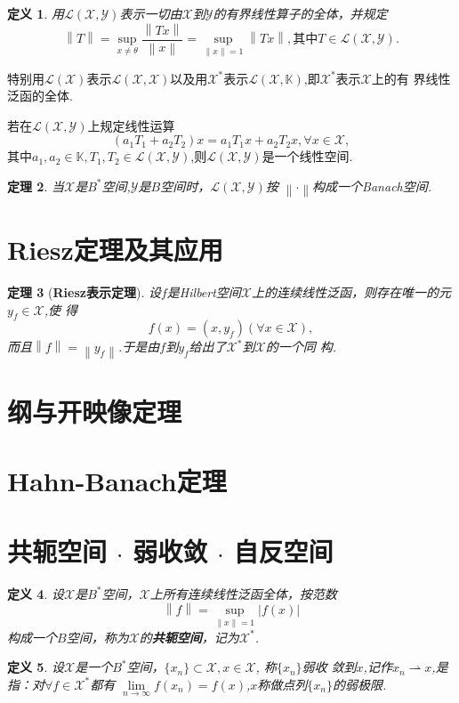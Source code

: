 \documentclass{ctexrep}
\newtheorem{defn}{定义}[section]
\newtheorem{thm}[defn]{定理}
\newcommand{\X}{\mathscr{X}}
\newcommand{\Y}{\mathscr{Y}}
\newcommand{\SCRL}{\mathscr{L}}
\newcommand{\K}{\mathbb{K}}
\newcommand{\LXY}{\mathscr{L}(\mathscr{X},\mathscr{Y})}
\newcommand{\LXX}{\mathscr{L}(\mathscr{X},\mathscr{X})}
\newcommand{\LXK}{\mathscr{L}(\mathscr{X},\mathbb{K})}
\newcommand{\norm}[1]{\left\lVert#1\right\rVert}
\newcommand{\abs}[1]{\left\lvert#1\right\rvert}
\begin{document}
\begin{defn}
用$\LXY$表示一切由$\X$到$\Y$的有界线性算子的全体，并规定
\[
\norm{T} = \sup_{x\neq \theta}\frac{\norm{Tx}}{\norm{x}} =
\sup_{\norm{x} = 1}\norm{Tx}, \text{其中}T \in \LXY.
\]
\end{defn}

特别用$\SCRL(\X)$表示$\LXX$以及用$\X^*$表示$\LXK$,即$\X^*$表示$\X$上的有
界线性泛函的全体.

若在$\LXY$上规定线性运算
\[
(a_1T_1 + a_2T_2)x = a_1T_1x + a_2T_2x, \forall x \in \X,
\]
其中$a_1,a_2 \in \K, T_1,T_2 \in \LXY$,则$\LXY$是一个线性空间.

\begin{thm}
当$\X$是$B^*$空间,$\Y$是$B$空间时，$\LXY$按
$\left\lVert\cdot\right\rVert$构成一个Banach空间.
\end{thm}

\section{Riesz定理及其应用}

\begin{thm}[\textbf{Riesz表示定理}]
设$f$是Hilbert空间$\X$上的连续线性泛函，则存在唯一的元$y_f \in \X$,使
得
\[
f(x) = (x,y_f) (\forall x \in \X),
\]
而且$\norm{f} = \norm{y_f}$.于是由$f$到$y_f$给出了$\X^*$到$\X$的一个同
构.
\end{thm}

\section{纲与开映像定理}

\section{Hahn-Banach定理}

\section{共轭空间 $\cdot$ 弱收敛 $\cdot$ 自反空间}

\begin{defn}
设$\X$是$B^*$空间，$\X$上所有连续线性泛函全体，按范数
\[
\norm{f} = \sup_{\norm{x}=1}\abs{f(x)}
\]
构成一个$B$空间，称为$\X$的\textbf{共轭空间}，记为$\X^*$.
\end{defn}

\begin{defn}
设$\X$是一个$B^*$空间，$\{x_n\} \subset \X, x \in \X$, 称$\{x_n\}$弱收
敛到$x$,记作$x_n \rightharpoonup x$,是指：对$\forall f \in \X^*$都有
$\lim\limits_{n\to \infty}f(x_n) = f(x)$,$x$称做点列$\{x_n\}$的弱极限.
\end{defn}
\end{document}
